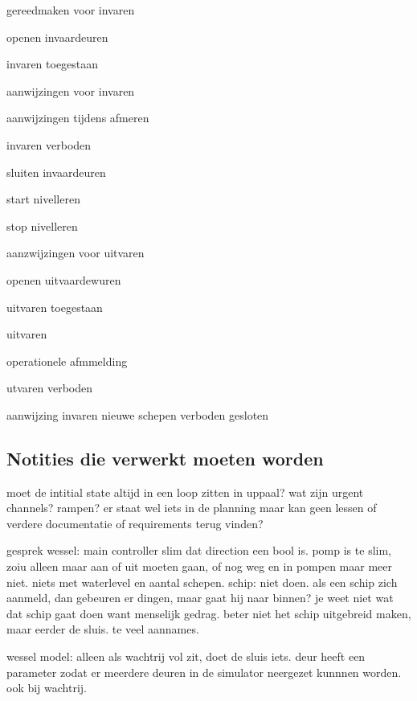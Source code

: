 {{{{{{{{{{{{{{\begin{itemize}
\begin{minipage}{0.4\linewidth}
		\item gereedmaken voor invaren
		\item openen invaardeuren
		\item invaren toegestaan
		\item aanwijzingen voor invaren
		\item aanwijzingen tijdens afmeren
		\item invaren verboden
		\item sluiten invaardeuren
		\item start nivelleren
		\item stop nivelleren
		\item aanzwijzingen voor uitvaren
		\item openen uitvaardewuren
		\item uitvaren toegestaan
	
\end{minipage}
	\begin{minipage}{0.4\linewidth}
	\item uitvaren
	\item operationele afmmelding
	\item utvaren verboden
	\item aanwijzing invaren nieuwe schepen
	\invaren verboden
	\deuren gesloten
	\end{minipage}
\end{itemize}


\subsection{Notities die verwerkt moeten worden}

moet de intitial state altijd in een loop zitten in uppaal?
wat zijn urgent channels?
rampen? er staat wel iets in de planning maar kan geen lessen of verdere documentatie of requirements terug vinden?	


gesprek wessel:
main controller slim dat direction een bool is. 
pomp is te slim, zoiu alleen maar aan of uit moeten gaan, of nog weg en in pompen maar meer niet. niets met waterlevel en aantal schepen.
schip: niet doen. als een schip zich aanmeld, dan gebeuren er dingen, maar gaat hij naar binnen? je weet niet wat dat schip gaat doen want menselijk gedrag. beter niet het schip uitgebreid maken, maar eerder de sluis. te veel aannames.

wessel model: alleen als wachtrij vol zit, doet de sluis iets.
deur heeft een parameter zodat er meerdere deuren in de simulator neergezet kunnnen worden. ook bij wachtrij.

}}}}}}}}}}}}}}
